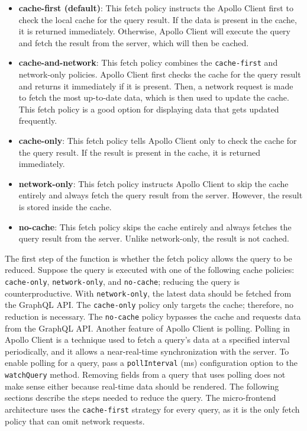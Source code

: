 \begin{itemize}
  \item \textbf{cache-first (default)}: This fetch policy instructs the Apollo Client first to check the local cache for the query result. If the data is present in the cache, it is returned immediately. Otherwise, Apollo Client will execute the query and fetch the result from the server, which will then be cached.
  \item \textbf{cache-and-network}: This fetch policy combines the \texttt{cache-first} and network-only policies. Apollo Client first checks the cache for the query result and returns it immediately if it is present. Then, a network request is made to fetch the most up-to-date data, which is then used to update the cache. This fetch policy is a good option for displaying data that gets updated frequently.
  \item \textbf{cache-only}: This fetch policy tells Apollo Client only to check the cache for the query result. If the result is present in the cache, it is returned immediately.
  \item \textbf{network-only}: This fetch policy instructs Apollo Client to skip the cache entirely and always fetch the query result from the server. However, the result is stored inside the cache.
  \item \textbf{no-cache}: This fetch policy skips the cache entirely and always fetches the query result from the server. Unlike network-only, the result is not cached.
\end{itemize}

\noindent The first step of the function is whether the fetch policy allows the query to be reduced. Suppose the query is executed with one of the following cache policies: \texttt{cache-only}, \texttt{network-only}, and \texttt{no-cache}; reducing the query is counterproductive. With \texttt{network-only}, the latest data should be fetched from the GraphQL \ac{API}. The \texttt{cache-only} policy only targets the cache; therefore, no reduction is necessary. The \texttt{no-cache} policy bypasses the cache and requests data from the GraphQL \ac{API}. Another feature of Apollo Client is polling. Polling in Apollo Client is a technique used to fetch a query's data at a specified interval periodically, and it allows a near-real-time synchronization with the server. To enable polling for a query, pass a \texttt{pollInterval} (ms) configuration option to the \texttt{watchQuery} method. Removing fields from a query that uses polling does not make sense either because real-time data should be rendered. The following sections describe the steps needed to reduce the query. The micro-frontend architecture uses the \texttt{cache-first} strategy for every query, as it is the only fetch policy that can omit network requests.

